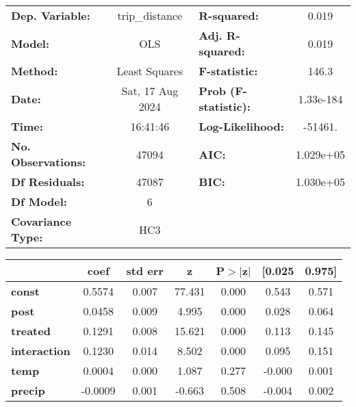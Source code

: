 \begin{center}
\begin{tabular}{lclc}
\toprule
\textbf{Dep. Variable:}    &  trip\_distance  & \textbf{  R-squared:         } &     0.019   \\
\textbf{Model:}            &       OLS        & \textbf{  Adj. R-squared:    } &     0.019   \\
\textbf{Method:}           &  Least Squares   & \textbf{  F-statistic:       } &     146.3   \\
\textbf{Date:}             & Sat, 17 Aug 2024 & \textbf{  Prob (F-statistic):} & 1.33e-184   \\
\textbf{Time:}             &     16:41:46     & \textbf{  Log-Likelihood:    } &   -51461.   \\
\textbf{No. Observations:} &       47094      & \textbf{  AIC:               } & 1.029e+05   \\
\textbf{Df Residuals:}     &       47087      & \textbf{  BIC:               } & 1.030e+05   \\
\textbf{Df Model:}         &           6      & \textbf{                     } &             \\
\textbf{Covariance Type:}  &       HC3        & \textbf{                     } &             \\
\bottomrule
\end{tabular}
\begin{tabular}{lcccccc}
                      & \textbf{coef} & \textbf{std err} & \textbf{z} & \textbf{P$> |$z$|$} & \textbf{[0.025} & \textbf{0.975]}  \\
\midrule
\textbf{const}        &       0.5574  &        0.007     &    77.431  &         0.000        &        0.543    &        0.571     \\
\textbf{post}         &       0.0458  &        0.009     &     4.995  &         0.000        &        0.028    &        0.064     \\
\textbf{treated}      &       0.1291  &        0.008     &    15.621  &         0.000        &        0.113    &        0.145     \\
\textbf{interaction}  &       0.1230  &        0.014     &     8.502  &         0.000        &        0.095    &        0.151     \\
\textbf{temp}         &       0.0004  &        0.000     &     1.087  &         0.277        &       -0.000    &        0.001     \\
\textbf{precip}       &      -0.0009  &        0.001     &    -0.663  &         0.508        &       -0.004    &        0.002     \\

\end{tabular}
\end{center}
